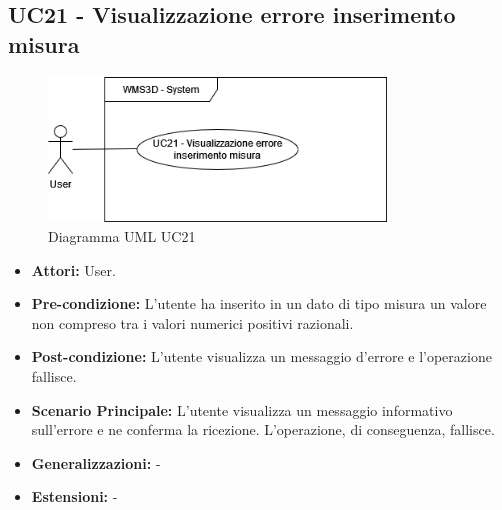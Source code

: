 \subsection{UC21 - Visualizzazione errore inserimento misura}
\begin{figure}[H]
  \centering
  \includegraphics[width=0.8\textwidth]{UC_diagrams_21-26/UC21.drawio.png}
   \caption{Diagramma UML UC21}
\end{figure}
\begin{itemize}
    \item \textbf{Attori:} User.
    \item \textbf{Pre-condizione:}  L'utente ha inserito in un dato di tipo misura un valore non compreso tra i valori numerici positivi razionali.
    \item \textbf{Post-condizione:} L'utente visualizza un messaggio d'errore e l'operazione fallisce.
    \item \textbf{Scenario Principale:}  L'utente visualizza un messaggio informativo sull'errore e ne conferma la ricezione. L'operazione, di conseguenza, fallisce.
    \item \textbf{Generalizzazioni:} -
    \item \textbf{Estensioni:} -
\end{itemize}